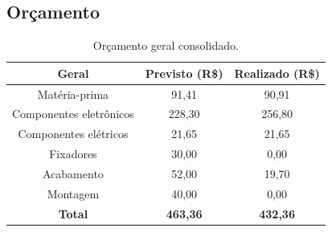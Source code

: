 \begin{landscape}

\chapter{Orçamento}

\begin{table}[htpb]
\begin{center}
\caption{Orçamento geral consolidado.}
\begin{tabular}{|c|c|c|}
\hline
\textbf{Geral}          & \textbf{Previsto (R\$)} & \textbf{Realizado (R\$)} \\ \hline
Matéria-prima           & 91,41                   & 90,91                    \\ \hline
Componentes eletrônicos & 228,30                  & 256,80                   \\ \hline
Componentes elétricos   & 21,65                   & 21,65                    \\ \hline
Fixadores               & 30,00                   & 0,00                     \\ \hline
Acabamento              & 52,00                   & 19,70                    \\ \hline
Montagem                & 40,00                   & 0,00                     \\ \hline
\textbf{Total}          & \textbf{463,36}         & \textbf{432,36}          \\ \hline
\end{tabular}
\end{center}
\end{table}

\clearpage


\end{landscape}
